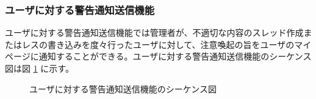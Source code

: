 \documentclass[a4j]{jarticle}
\begin{document}
 \subsubsection{ユーザに対する警告通知送信機能}
 ユーザに対する警告通知送信機能では管理者が、不適切な内容のスレッド作成またはレスの書き込みを度々行ったユーザに対して、注意喚起の旨をユーザのマイページに通知することができる。ユーザに対する警告通知送信機能のシーケンス図は図 \ref{fig:admin_user_warning.png} に示す。
 \begin{figure}[H]
\centering
{}
\caption{ユーザに対する警告通知送信機能のシーケンス図}
\label{fig:admin_user_warning.png}
\end{figure}
\end{document}
